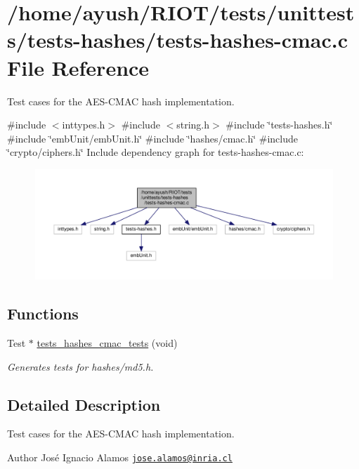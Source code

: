\hypertarget{tests-hashes-cmac_8c}{}\section{/home/ayush/\+R\+I\+O\+T/tests/unittests/tests-\/hashes/tests-\/hashes-\/cmac.c File Reference}
\label{tests-hashes-cmac_8c}


Test cases for the A\+E\+S-\/\+C\+M\+AC hash implementation.  


{\ttfamily \#include $<$inttypes.\+h$>$}\newline
{\ttfamily \#include $<$string.\+h$>$}\newline
{\ttfamily \#include \char`\"{}tests-\/hashes.\+h\char`\"{}}\newline
{\ttfamily \#include \char`\"{}emb\+Unit/emb\+Unit.\+h\char`\"{}}\newline
{\ttfamily \#include \char`\"{}hashes/cmac.\+h\char`\"{}}\newline
{\ttfamily \#include \char`\"{}crypto/ciphers.\+h\char`\"{}}\newline
Include dependency graph for tests-\/hashes-\/cmac.c\+:
\nopagebreak
\begin{figure}[H]
\begin{center}
\leavevmode
\includegraphics[width=350pt]{tests-hashes-cmac_8c__incl}
\end{center}
\end{figure}
\subsection*{Functions}
\begin{DoxyCompactItemize}
\item 
Test $\ast$ \hyperlink{group__unittests_ga1a28ef20665a197204a84eb23688d340}{tests\+\_\+hashes\+\_\+cmac\+\_\+tests} (void)
\begin{DoxyCompactList}\small\item\em Generates tests for hashes/md5.\+h. \end{DoxyCompactList}\end{DoxyCompactItemize}


\subsection{Detailed Description}
Test cases for the A\+E\+S-\/\+C\+M\+AC hash implementation. 

\begin{DoxyAuthor}{Author}
José Ignacio Alamos \href{mailto:jose.alamos@inria.cl}{\tt jose.\+alamos@inria.\+cl} 
\end{DoxyAuthor}

